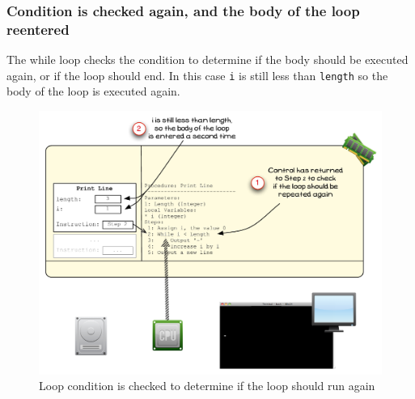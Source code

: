 \subsubsection{Condition is checked again, and the body of the loop reentered} %
\label{ssub:condition_is_checked_again_and_the_body_of_the_loop_rentered}

The while loop checks the condition to determine if the body should be executed again, or if the loop should end. In this case \texttt{i} is still less than \texttt{length} so the body of the loop is executed again.

\begin{figure}[htbp]
   \centering
   \includegraphics[width=\textwidth]{./topics/control-flow/images/PrintLine5} 
   \caption{Loop condition is checked to determine if the loop should run again}
   \label{fig:print-line-5}
\end{figure}


